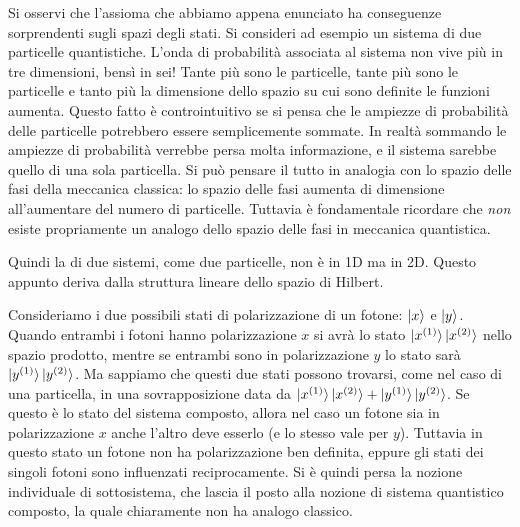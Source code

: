 \documentclass[../../FisicaTeorica.tex]{subfiles}
\begin{document}
Si osservi che l’assioma che abbiamo appena enunciato ha conseguenze sorprendenti sugli spazi degli stati. Si consideri ad esempio un sistema di due particelle quantistiche. L’onda di probabilità associata al sistema non vive più in tre dimensioni, bensì in sei! Tante più sono le particelle, tante più sono le particelle e tanto più la dimensione dello spazio su cui sono definite le funzioni aumenta. Questo fatto è controintuitivo se si pensa che le ampiezze di probabilità delle particelle potrebbero essere semplicemente sommate. In realtà sommando le ampiezze di probabilità verrebbe persa molta informazione, e il sistema sarebbe quello di una sola particella. %
Si può pensare il tutto in analogia con lo spazio delle fasi della meccanica classica: lo spazio delle fasi aumenta di dimensione all’aumentare del numero di particelle. Tuttavia è fondamentale ricordare che \emph{non} esiste propriamente un analogo dello spazio delle fasi in meccanica quantistica.

Quindi la  di due sistemi, come due particelle, non è in 1D ma in 2D. Questo appunto deriva dalla struttura lineare dello spazio di Hilbert.

\begin{es}
Consideriamo i due possibili stati di polarizzazione di un fotone: $\ket{x}$ e $\ket{y}$. Quando entrambi i fotoni hanno polarizzazione $x$ si avrà lo stato $\ket{x^{(1)}}\ket{x^{(2)}}$ nello spazio prodotto, mentre se entrambi sono in polarizzazione $y$ lo stato sarà $\ket{y^{(1)}}\ket{y^{(2)}}$. Ma sappiamo che questi due stati possono trovarsi, come nel caso di una particella, in una sovrapposizione data da $\ket{x^{(1)}}\ket{x^{(2)}} + \ket{y^{(1)}}\ket{y^{(2)}}$. Se questo è lo stato del sistema composto, allora nel caso un fotone sia in polarizzazione $x$ anche l'altro deve esserlo (e lo stesso vale per $y$). Tuttavia in questo stato un fotone non ha polarizzazione ben definita, eppure gli stati dei singoli fotoni sono influenzati reciprocamente. Si è quindi persa la nozione individuale di sottosistema, che lascia il posto alla nozione di sistema quantistico composto, la quale chiaramente non ha analogo classico.
\end{es}
\end{document}

